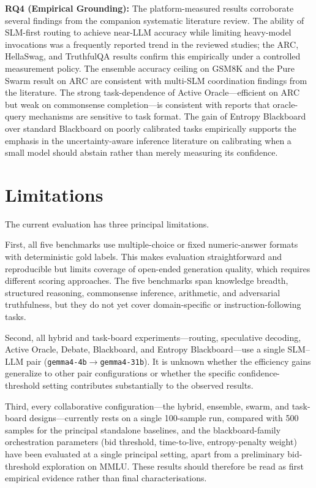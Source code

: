 \textbf{RQ4 (Empirical Grounding):} The platform-measured results corroborate several findings from the companion systematic literature review. The ability of SLM-first routing to achieve near-LLM accuracy while limiting heavy-model invocations was a frequently reported trend in the reviewed studies; the ARC, HellaSwag, and TruthfulQA results confirm this empirically under a controlled measurement policy. The ensemble accuracy ceiling on GSM8K and the Pure Swarm result on ARC are consistent with multi-SLM coordination findings from the literature. The strong task-dependence of Active Oracle---efficient on ARC but weak on commonsense completion---is consistent with reports that oracle-query mechanisms are sensitive to task format. The gain of Entropy Blackboard over standard Blackboard on poorly calibrated tasks empirically supports the emphasis in the uncertainty-aware inference literature on calibrating when a small model should abstain rather than merely measuring its confidence.

\section{Limitations}

The current evaluation has three principal limitations.

First, all five benchmarks use multiple-choice or fixed numeric-answer formats with deterministic gold labels. This makes evaluation straightforward and reproducible but limits coverage of open-ended generation quality, which requires different scoring approaches. The five benchmarks span knowledge breadth, structured reasoning, commonsense inference, arithmetic, and adversarial truthfulness, but they do not yet cover domain-specific or instruction-following tasks.

Second, all hybrid and task-board experiments---routing, speculative decoding, Active Oracle, Debate, Blackboard, and Entropy Blackboard---use a single SLM--LLM pair (\texttt{gemma4-4b}$\rightarrow$\texttt{gemma4-31b}). It is unknown whether the efficiency gains generalize to other pair configurations or whether the specific confidence-threshold setting contributes substantially to the observed results.

Third, every collaborative configuration---the hybrid, ensemble, swarm, and task-board designs---currently rests on a single 100-sample run, compared with 500 samples for the principal standalone baselines, and the blackboard-family orchestration parameters (bid threshold, time-to-live, entropy-penalty weight) have been evaluated at a single principal setting, apart from a preliminary bid-threshold exploration on MMLU. These results should therefore be read as first empirical evidence rather than final characterisations.

